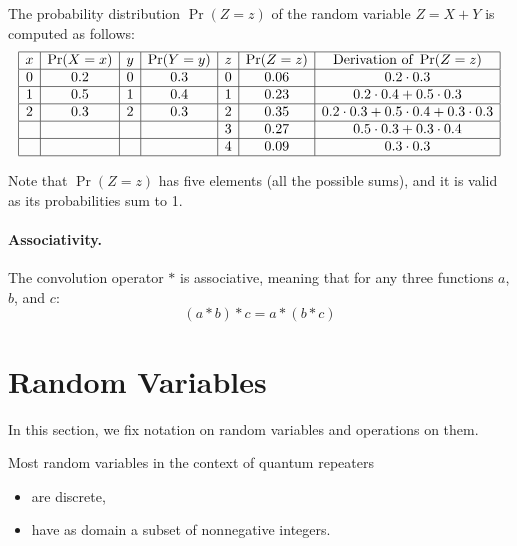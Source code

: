 \documentclass{masterthesis}
\begin{document}
The probability distribution $\Pr(Z = z)$ of the random variable $Z = X + Y$ is computed as follows:
\begin{equation*}\label{eq:convolution_example}
    \begin{array}{|c|c|c|c|c|c|c|}
        \hline
        x & \Pr(X = x) & y & \Pr(Y = y) & z & \Pr(Z = z) & \text{Derivation of }\Pr(Z = z)\\
        \hline
        0 & 0.2 & 0 & 0.3 & 0 & 0.06 & 0.2 \cdot 0.3 \\
        \hline
        1 & 0.5 & 1 & 0.4 & 1 & 0.23 & 0.2 \cdot 0.4 + 0.5 \cdot 0.3 \\
        \hline
        2 & 0.3 & 2 & 0.3 & 2 & 0.35 & 0.2 \cdot 0.3 + 0.5 \cdot 0.4 + 0.3 \cdot 0.3 \\
        \hline
         &  &  &  & 3 & 0.27 & 0.5 \cdot 0.3 + 0.3 \cdot 0.4 \\
        \hline
         &  &  &  & 4 & 0.09 & 0.3 \cdot 0.3 \\
        \hline
    \end{array}
\end{equation*}

Note that $\Pr(Z = z)$ has five elements (all the possible sums), and it is valid as its probabilities sum to 1.

\paragraph*{Associativity.}
\begin{samepage}
    The convolution operator \( * \) is associative, meaning that for any three functions \(a\), \(b\), and \(c\):
    \begin{equation}\label{eq:convolution_associativity} 
        (a * b) * c = a * (b * c)
    \end{equation}        
\end{samepage}

\section{Random Variables}\label{app:random_variables}

In this section, we fix notation on random variables and operations on them. 

Most random variables in the context of quantum repeaters
\begin{itemize}
    \item are discrete,
    \item have as domain a subset of nonnegative integers.
\end{itemize}
\end{document}
